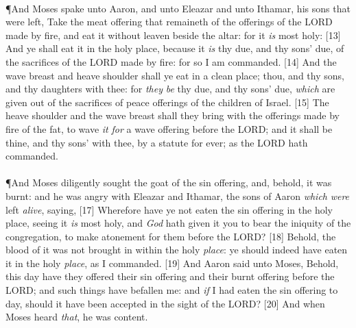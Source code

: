 \\
\P \textcolor[cmyk]{0.99998,1,0,0}{And Moses spake unto Aaron, and unto Eleazar and unto Ithamar, his sons that were left, Take the meat offering that remaineth of the offerings of the LORD made by fire, and eat it without leaven beside the altar: for it \emph{is} most holy:}
[13] \textcolor[cmyk]{0.99998,1,0,0}{And ye shall eat it in the holy place, because it \emph{is} thy due, and thy sons' due, of the sacrifices of the LORD made by fire: for so I am commanded.}
[14] \textcolor[cmyk]{0.99998,1,0,0}{And the wave breast and heave shoulder shall ye eat in a clean place; thou, and thy sons, and thy daughters with thee: for \emph{they} \emph{be} thy due, and thy sons' due, \emph{which} are given out of the sacrifices of peace offerings of the children of Israel.}
[15] \textcolor[cmyk]{0.99998,1,0,0}{The heave shoulder and the wave breast shall they bring with the offerings made by fire of the fat, to wave \emph{it} \emph{for} a wave offering before the LORD; and it shall be thine, and thy sons' with thee, by a statute for ever; as the LORD hath commanded.}\\
\\
\P \textcolor[cmyk]{0.99998,1,0,0}{And Moses diligently sought the goat of the sin offering, and, behold, it was burnt: and he was angry with Eleazar and Ithamar, the sons of Aaron \emph{which} \emph{were} left \emph{alive}, saying,}
[17] \textcolor[cmyk]{0.99998,1,0,0}{Wherefore have ye not eaten the sin offering in the holy place, seeing it \emph{is} most holy, and \emph{God} hath given it you to bear the iniquity of the congregation, to make atonement for them before the LORD?}
[18] \textcolor[cmyk]{0.99998,1,0,0}{Behold, the blood of it was not brought in within the holy \emph{place}: ye should indeed have eaten it in the holy \emph{place}, as I commanded.}
[19] \textcolor[cmyk]{0.99998,1,0,0}{And Aaron said unto Moses, Behold, this day have they offered their sin offering and their burnt offering before the LORD; and such things have befallen me: and \emph{if} I had eaten the sin offering to day, should it have been accepted in the sight of the LORD?}
[20] \textcolor[cmyk]{0.99998,1,0,0}{And when Moses heard \emph{that}, he was content.}